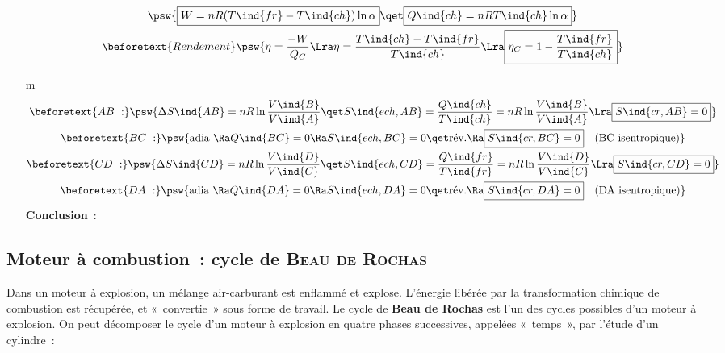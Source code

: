 \documentclass[../../main/main.tex]{subfiles}
\begin{document}
\begin{tcb*}[breakable]
\begin{enumerate}[label=\sqenumi]
\begin{gather*}
				\psw{%
					\boxed{W = nR(T\ind{fr} - T\ind{ch})\ln \alpha}
					\qet
					\boxed{Q\ind{ch} = nRT\ind{ch}\ln \alpha}
				}%
				\\\beforetext{Rendement}
				\psw{%
					\eta = \frac{-W}{Q_C}
					\Lra
					\eta = \frac{T\ind{ch}-T\ind{fr}}{T\ind{ch}}
					\Lra
					\boxed{\eta_C = 1-\frac{T\ind{fr}}{T\ind{ch}}}
				}%
			\end{gather*}
		\item[m]
			\begin{gather*}
				\beforetext{AB~:}
				\psw{%
					\Delta{S}\ind{AB} = nR \ln \frac{V\ind{B}}{V\ind{A}}
					\qet
					S\ind{ech,AB} = \frac{Q\ind{ch}}{T\ind{ch}} = nR \ln
					\frac{V\ind{B}}{V\ind{A}}
					\Lra
					\boxed{S\ind{cr,AB} = 0}
				}%
				\\\beforetext{BC~:}
				\psw{%
					\text{adia~} \Ra Q\ind{BC} = 0
					\Ra
					S\ind{ech,BC} = 0
					\qet
					\text{rév.} \Ra \boxed{S\ind{cr,BC} = 0}
					\quad \text{(BC isentropique)}
				}%
				\\\beforetext{CD~:}
				\psw{%
					\Delta{S}\ind{CD} = nR \ln \frac{V\ind{D}}{V\ind{C}}
					\qet
					S\ind{ech,CD} = \frac{Q\ind{fr}}{T\ind{fr}} = nR \ln
					\frac{V\ind{D}}{V\ind{C}}
					\Lra
					\boxed{S\ind{cr,CD} = 0}
				}%
				\\\beforetext{DA~:}
				\psw{%
					\text{adia~} \Ra Q\ind{DA} = 0
					\Ra
					S\ind{ech,DA} = 0
					\qet
					\text{rév.} \Ra \boxed{S\ind{cr,DA} = 0}
					\quad \text{(DA isentropique)}
				}%
			\end{gather*}
			\textbf{Conclusion}~: 
	\end{enumerate}
\end{tcb*}

\vspace{-15pt}

\subsection{Moteur à combustion~: cycle de \textsc{Beau de Rochas}}
Dans un moteur à explosion, un mélange air-carburant est enflammé et explose.
L'énergie libérée par la transformation chimique de combustion est récupérée, et
«~convertie~» sous forme de travail. Le cycle de \textbf{Beau de Rochas} est l'un des cycles possibles d'un moteur à explosion. On peut
décomposer le cycle d'un moteur à explosion en quatre phases successives,
appelées «~temps~», par l'étude d'un
cylindre~:
\end{document}
